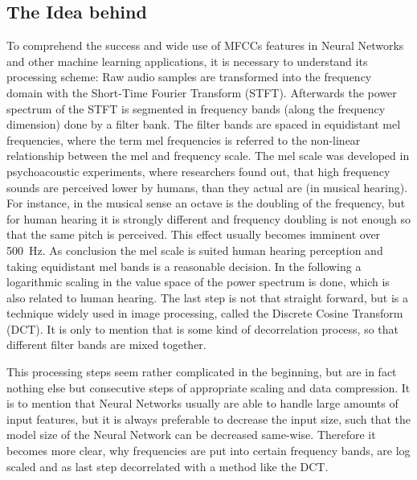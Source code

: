 \subsection{The Idea behind}
To comprehend the success and wide use of MFCCs features in Neural Networks and other machine learning applications, it is necessary to understand its processing scheme:
Raw audio samples are transformed into the frequency domain with the Short-Time Fourier Transform (STFT).
Afterwards the power spectrum of the STFT is segmented in frequency bands (along the frequency dimension) done by a filter bank.
The filter bands are spaced in equidistant mel frequencies,
where the term mel frequencies is referred to the non-linear relationship between the mel and frequency scale.
The mel scale was developed in psychoacoustic experiments, where researchers found out, that high frequency sounds are perceived lower by humans, than they actual are (in musical hearing). For instance, in the musical sense an octave is the doubling of the frequency, but for human hearing it is strongly different and frequency doubling is not enough so that the same pitch is perceived.
This effect usually becomes imminent over \SI{500}{\hertz}.
As conclusion the mel scale is suited human hearing perception and taking equidistant mel bands is a reasonable decision.
In the following a logarithmic scaling in the value space of the power spectrum is done, which is also related to human hearing.
The last step is not that straight forward, but is a technique widely used in image processing, called the Discrete Cosine Transform (DCT).
It is only to mention that is some kind of decorrelation process, so that different filter bands are mixed together.

This processing steps seem rather complicated in the beginning, but are in fact nothing else but consecutive steps of appropriate scaling and data compression.
It is to mention that Neural Networks usually are able to handle large amounts of input features, but it is always preferable to decrease the input size, such that the model size of the Neural Network can be decreased same-wise.
Therefore it becomes more clear, why frequencies are put into certain frequency bands, are log scaled and as last step decorrelated with a method like the DCT.

